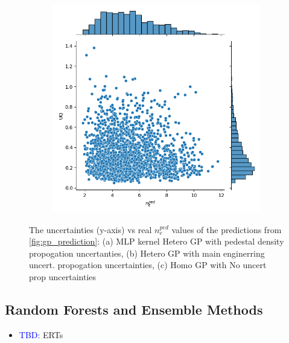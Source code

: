 \documentclass[a4paper, twoside, final, 12pt]{article}
\begin{document}
{\begin{figure}
\begin{subfigure}{0.33\linewidth}
		\caption{}
		\label{subfig:hetero_gp_neped}
	\end{subfigure}
	\begin{subfigure}{0.33\linewidth}
		\centering
		\includegraphics[scale=0.3]{./src/GP_RatQuad_HomoDesiastic_uncerts}
		\caption{}
		\label{subfig:homo_gp}
	\end{subfigure}
	\caption{The uncertainties (y-axis) vs real $n_e^{ped}$ values of the predictions from \ref{fig:gp_prediction}: (a) MLP kernel Hetero GP  with pedestal density propogation uncertanties, (b) Hetero GP with main enginerring uncert. propogation uncertainties, (c) Homo GP with No uncert prop uncertainties}
	\label{fig:gp_uncerts}
\end{figure}


\subsection{Random Forests and Ensemble Methods}
\begin{itemize}
	\item \textcolor{blue}{TBD: }ERTs
\end{itemize}

}
\end{document}

